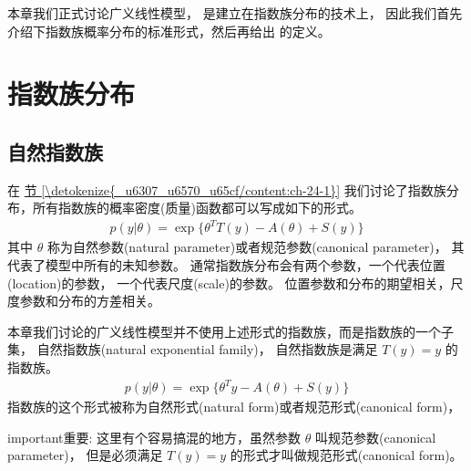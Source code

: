 \documentclass[letterpaper,10pt,english]{sphinxmanual}
\begin{document}
本章我们正式讨论广义线性模型， 是建立在指数族分布的技术上，
因此我们首先介绍下指数族概率分布的标准形式，然后再给出  的定义。


\section{指数族分布}
\label{\detokenize{_u5e7f_u4e49_u7ebf_u6027_u6a21_u578b/content:id2}}

\subsection{自然指数族}
\label{\detokenize{_u5e7f_u4e49_u7ebf_u6027_u6a21_u578b/content:id3}}
在 \hyperref[\detokenize{_u6307_u6570_u65cf/content:ch-24-1}]{节 \ref{\detokenize{_u6307_u6570_u65cf/content:ch-24-1}}} 我们讨论了指数族分布，所有指数族的概率密度(质量)函数都可以写成如下的形式。
\begin{equation}\label{equation:广义线性模型/content:eq_34_08}
\begin{split}p(y|\theta) = \exp \{\theta^T T(y) - A(\theta) + S(y)\}\end{split}
\end{equation}
其中 \(\theta\)
称为自然参数(natural parameter)或者规范参数(canonical parameter)，
其代表了模型中所有的未知参数。
通常指数族分布会有两个参数，一个代表位置(location)的参数，
一个代表尺度(scale)的参数。
位置参数和分布的期望相关，尺度参数和分布的方差相关。

本章我们讨论的广义线性模型并不使用上述形式的指数族，而是指数族的一个子集，
自然指数族(natural exponential family)，
自然指数族是满足 \(T(y)=y\) 的指数族。
\begin{equation}\label{equation:广义线性模型/content:eq_34_09}
\begin{split}p(y|\theta) = \exp \{\theta^T y - A(\theta) + S(y)\}\end{split}
\end{equation}
指数族的这个形式被称为自然形式(natural form)或者规范形式(canonical form)，

\begin{sphinxadmonition}{important}{重要:}
这里有个容易搞混的地方，虽然参数 \(\theta\) 叫规范参数(canonical parameter)，
但是必须满足 \(T(y)=y\) 的形式才叫做规范形式(canonical form)。
\end{sphinxadmonition}
\end{document}
